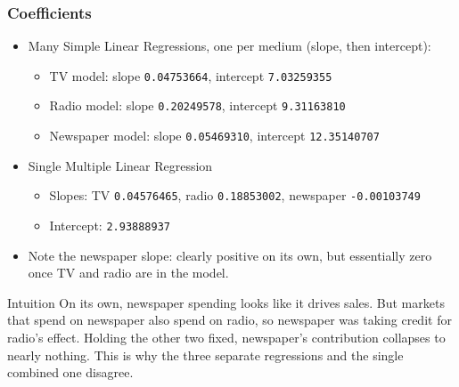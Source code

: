 \begin{frame}[fragile]\frametitle{Coefficients}
\begin{itemize}
\item Many Simple Linear Regressions, one per medium (slope, then intercept):
	\begin{itemize}
	\item TV model: slope \texttt{0.04753664}, intercept \texttt{7.03259355}
	\item Radio model: slope \texttt{0.20249578}, intercept \texttt{9.31163810}
	\item Newspaper model: slope \texttt{0.05469310}, intercept \texttt{12.35140707}
	\end{itemize}

\item Single Multiple Linear Regression
	\begin{itemize}
	\item Slopes: TV \texttt{0.04576465}, radio \texttt{0.18853002}, newspaper \texttt{-0.00103749}
	\item Intercept: \texttt{2.93888937}
	\end{itemize}

\item Note the newspaper slope: clearly positive on its own, but essentially zero once TV and radio are in the model.
\end{itemize}

\begin{block}{Intuition}
On its own, newspaper spending looks like it drives sales. But markets that spend on newspaper also spend on radio, so newspaper was taking credit for radio's effect. Holding the other two fixed, newspaper's contribution collapses to nearly nothing. This is why the three separate regressions and the single combined one disagree.
\end{block}
\end{frame}




